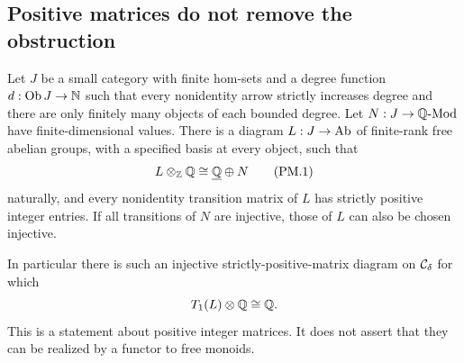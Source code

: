 \subsection{Positive matrices do not remove the obstruction}

\begin{proposition}
\label{G:positive-matrix-stabilization}
Let $J$ be a small category with finite hom-sets and a degree
function $d:\operatorname{Ob}J\to\mathbb N$ such that every
nonidentity arrow strictly increases degree and there are
only finitely many objects of each bounded degree. Let
$N:J\to\mathbb Q\text{-}\mathrm{Mod}$ have finite-dimensional values.
There is a diagram $L:J\to\mathrm{Ab}$ of finite-rank free abelian
groups, with a specified basis at every object, such that
\[
 L\otimes_{\mathbb Z}\mathbb Q\cong\underline{\mathbb Q}\oplus N
 \tag{PM.1}
\]
naturally, and every nonidentity transition matrix of $L$ has
strictly positive integer entries. If all transitions of $N$
are injective, those of $L$ can also be chosen injective.

In particular there is such an injective strictly-positive-matrix
diagram on $\mathcal C_\delta$ for which
\[
 T_1(L)\otimes\mathbb Q\cong\mathbb Q.
\]
This is a statement about positive integer matrices. It does
not assert that they can be realized by a functor to free
monoids.
\end{proposition}
